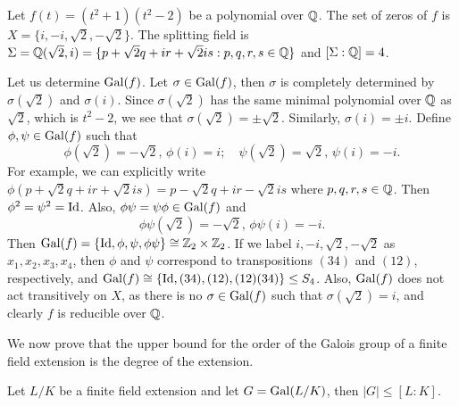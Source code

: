 \begin{example} \label{exm:galois-group}
	Let $f(t) = (t^2 + 1)(t^2 - 2)$ be a polynomial over $\mathbb Q$. The set of zeros of $f$ is $X = \{i, -i, \sqrt 2, -\sqrt 2\}$. The splitting field is $\Sigma = \mathbb Q(\sqrt 2, i) = \{p+\sqrt 2 q + i r + \sqrt 2 i s : p, q, r, s \in \mathbb Q\}$ and $[\Sigma : \mathbb Q] = 4$. 
	
	Let us determine $\operatorname{Gal}(f)$. Let $\sigma \in \operatorname{Gal}(f)$, then $\sigma$ is completely determined by $\sigma(\sqrt 2)$ and $\sigma(i)$. Since $\sigma(\sqrt 2)$ has the same minimal polynomial over $\mathbb Q$ as $\sqrt 2$, which is $t^2 - 2$, we see that $\sigma(\sqrt 2) = \pm \sqrt 2$. Similarly, $\sigma(i) = \pm i$. Define $\phi, \psi \in \operatorname{Gal}(f)$ such that 
	$$
		\phi(\sqrt 2) = -\sqrt 2, \, \phi(i) = i; \quad
		\psi(\sqrt 2) = \sqrt 2, \, \psi (i) = -i. 
	$$
	For example, we can explicitly write $\phi(p + \sqrt 2 q + i r + \sqrt 2 i s) = p - \sqrt 2 q + i r - \sqrt 2 i s$ where $p,q,r,s \in \mathbb Q$. Then $\phi ^ 2 = \psi ^ 2 = \operatorname{Id}$. Also, $\phi\psi  = \psi \phi \in \operatorname{Gal}(f)$ and $$\phi\psi(\sqrt 2) = -\sqrt 2, \, \phi\psi(i) = -i. $$
	Then $\operatorname{Gal}(f) = \{\operatorname{Id}, \phi, \psi, \phi \psi \} \cong \mathbb Z_2 \times \mathbb Z_2$. If we label $i, -i, \sqrt 2, -\sqrt 2$ as $x_1, x_2, x_3, x_4$, then $\phi$ and $\psi$ correspond to transpositions $(34)$ and $(12)$, respectively, and $\operatorname{Gal}(f) \cong \{\operatorname{Id}, (34), (12), (12)(34)\} \le S_4$. Also, $\operatorname{Gal}(f)$ does not act transitively on $X$, as there is no $\sigma \in \operatorname{Gal}(f)$ such that $\sigma(\sqrt 2) = i$, and clearly $f$ is reducible over $\mathbb Q$.
\end{example}

We now prove that the upper bound for the order of the Galois group of a finite field extension is the degree of the extension. 

\begin{theorem} \label{thm:galois-group-order-upper-bound}
	Let $L/K$ be a finite field extension and let $G = \operatorname{Gal}(L/K)$, then $|G| \le [L:K]$. 
\end{theorem}

